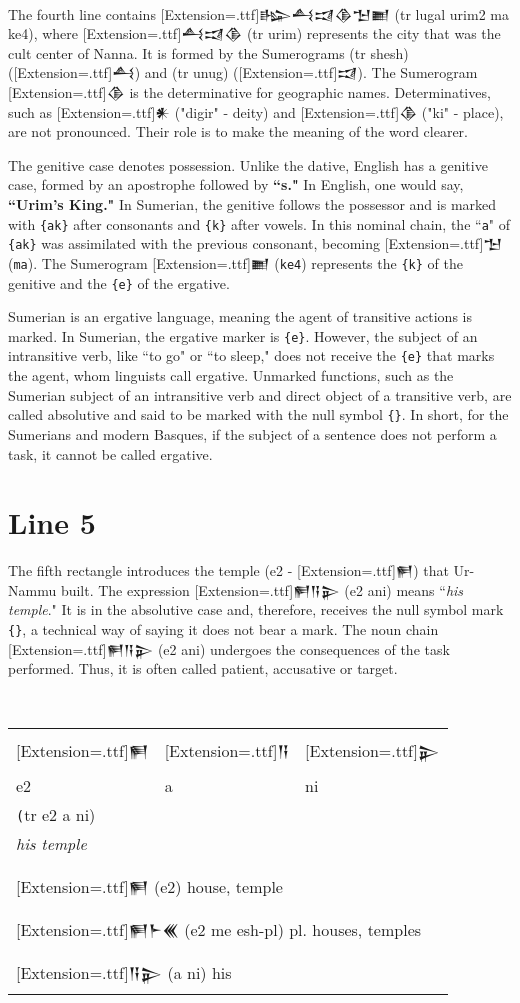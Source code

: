 \documentclass[a4paper,12pt]{book}
\newcommand{\fcn}{\setmainfont{Akkadian}[Extension=.ttf]}
\begin{document}
\verb||\\
The fourth line contains {\fcn 𒈗𒋀𒀕𒆠𒈠𒆤}
(tr lugal urim2 ma ke4), where {\fcn 𒋀𒀕𒆠} (tr urim)
represents the city that was the cult center of Nanna.
It is formed by the Sumerograms (tr shesh) ({\fcn 𒋀})
and (tr unug) ({\fcn 𒀕}).
The Sumerogram {\fcn 𒆠} is the determinative
for geographic names. Determinatives,
such as {\fcn 𒀭} ("digir" - deity)
and {\fcn 𒆠} ("ki" - place), are not pronounced.
Their role is to make the meaning of the word clearer.

The genitive case denotes possession.
Unlike the dative, English has a genitive case,
formed by an apostrophe followed by {\bf ``s."}
In English, one would say, {\bf ``Urim's King."}
In Sumerian, the genitive follows the possessor
and is marked with \verb|{ak}| after consonants
and \verb|{k}| after vowels. In this nominal
chain, the ``\verb|a|" of \verb|{ak}| was
assimilated with the previous consonant,
becoming {\fcn 𒈠} (\verb|ma|).
The Sumerogram {\fcn 𒆤} (\verb|ke4|)
represents the \verb|{k}| of the genitive
and the \verb|{e}| of the ergative.

Sumerian is an ergative language, meaning the agent
of transitive actions is marked. In Sumerian, the
ergative marker is \verb|{e}|. However, the subject
of an intransitive verb, like ``to go" or ``to sleep,"
does not receive the \verb|{e}| that marks the agent,
whom linguists call ergative. Unmarked functions,
such as the Sumerian subject of an intransitive
verb and direct object of a transitive verb,
are called absolutive and said to be marked
with the null symbol \verb|{}|.
In short, for the Sumerians and
modern Basques, if the subject of a sentence
does not perform a task, it cannot be called ergative.

\section{Line 5}
The fifth rectangle introduces the
temple (e2 - {\fcn 𒂍}) that Ur-Nammu built.
The expression {\fcn 𒂍𒀀𒉌} (e2 ani)
means ``{\em his temple}." It is in the absolutive
case and, therefore, receives the null
symbol mark \verb|{}|, a technical way of
saying it does not bear a mark.
The noun chain {\fcn 𒂍𒀀𒉌} (e2 ani) undergoes
the consequences of the task performed.
Thus, it is often called patient, accusative or target.

\verb||\\
\begin{tabular}[!h]{l l l}
\fcn\Large 𒂍
&\fcn\Large 𒀀 &\fcn\Large 𒉌\\
  e2 & a & ni\\
\multicolumn{3}{l}{\texttt (tr e2 a ni)}\\
\multicolumn{3}{l}{\em his temple}\\
\hline\\
\multicolumn{3}{l}{{\fcn 𒂍}
  (e2) house, temple }\\
\multicolumn{3}{l}{{\fcn 𒂍𒈨𒌍} 
                    (e2 me esh-pl) pl. houses, temples }\\
\multicolumn{3}{l}{{\fcn 𒀀𒉌}
                    (a ni) his }\\
\end{tabular}
\index{e2 me esh-pl {\fcn 𒂍𒈨𒌍} ! houses}
\end{document}
